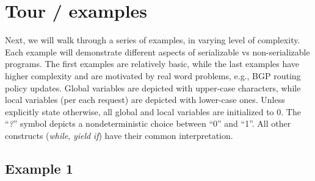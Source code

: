 \newpage


\section{Tour / examples}
\label{sec:tour}

Next, we will walk through a series of examples, in varying level of complexity. Each example will demonstrate different aspects of serializable vs non-serializable programs.
%
The first examples are relatively basic, while the last examples have higher complexity and are motivated by real word problems, e.g., BGP routing policy updates.
%
Global variables are depicted with upper-case characters, while local variables (per each request) are depicted with lower-case ones.
%
Unless explicitly state otherwise, all global and local variables are initialized to 0.
%
The ``\textit{?}'' symbol depicts a nondeterministic choice between ``0'' and ``1''. All other constructs (\textit{while}, \textit{yield} \textit{if}) have their common interpretation.


\subsection{Example 1}


